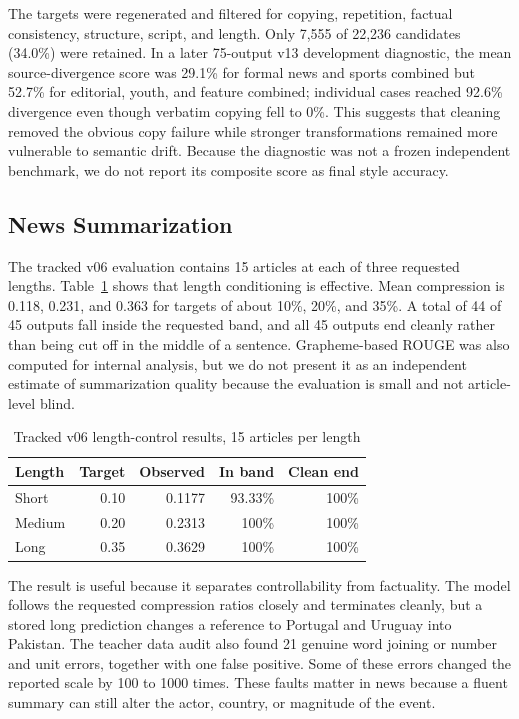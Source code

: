 \documentclass[a4paper,conference]{IEEEtran}
\begin{document}
The targets were regenerated and filtered for copying, repetition, factual
consistency, structure, script, and length. Only 7,555 of 22,236 candidates
(34.0\%) were retained. In a later 75-output v13 development diagnostic, the
mean source-divergence score was 29.1\% for formal news and sports combined but
52.7\% for editorial, youth, and feature combined; individual cases reached
92.6\% divergence even though verbatim copying fell to 0\%. This suggests that
cleaning removed the obvious copy failure while stronger transformations
remained more vulnerable to semantic drift. Because the diagnostic was not a
frozen independent benchmark, we do not report its composite score as final
style accuracy.

\subsection{News Summarization}
The tracked v06 evaluation contains 15 articles at each of three requested
lengths. Table~\ref{tab:summary} shows that length conditioning is effective.
Mean compression is 0.118, 0.231, and 0.363 for targets of about 10\%, 20\%,
and 35\%. A total of 44 of 45 outputs fall inside the requested band, and all
45 outputs end cleanly rather than being cut off in the middle of a sentence.
Grapheme-based ROUGE was also computed for internal analysis, but we do not
present it as an independent estimate of summarization quality because the
evaluation is small and not article-level blind.

\begin{table}[!b]
\caption{Tracked v06 length-control results, 15 articles per length}
\label{tab:summary}
\centering
\footnotesize
\setlength{\tabcolsep}{3.2pt}
\renewcommand{\arraystretch}{1.03}
\begin{tabular}{|l|r|r|r|r|}
\hline
\textbf{Length} & \textbf{Target} & \textbf{Observed} & \textbf{In band} & \textbf{Clean end} \\
\hline
Short  & 0.10 & 0.1177 & 93.33\% & 100\% \\
\hline
Medium & 0.20 & 0.2313 & 100\% & 100\% \\
\hline
Long   & 0.35 & 0.3629 & 100\% & 100\% \\
\hline
\end{tabular}
\end{table}

The result is useful because it separates controllability from factuality. The
model follows the requested compression ratios closely and terminates cleanly,
but a stored long prediction changes a reference to Portugal and Uruguay into Pakistan.
The teacher data audit also found 21 genuine word joining or number and unit
errors, together with one false positive. Some of these errors changed the
reported scale by 100 to 1000 times. These faults matter in news because a fluent summary can still alter the
actor, country, or magnitude of the event.
\end{document}
